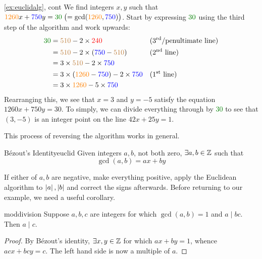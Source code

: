 \begin{example*}{\ref{ex:euclidalg}, cont}{}
	We find integers $x,y$ such that $\textcolor{orange}{1260}x+\textcolor{blue}{750}y=\textcolor{Green}{30} \bigm(=\gcd(\textcolor{orange}{1260},\textcolor{blue}{750})\bigr)$.\smallbreak
	Start by expressing $\textcolor{Green}{30}$ using the third step of the algorithm and work upwards:
	\begin{align*}
		\textcolor{Green}{30} &=\textcolor{brown}{510}-2\times\textcolor{red}{240} & &\text{(3\rd/penultimate line)}\\
		&=\textcolor{brown}{510}-2\times (\textcolor{blue}{750}-\textcolor{brown}{510}) &&\text{(2\nd{} line)}\\
		&=3\times \textcolor{brown}{510}-2\times \textcolor{blue}{750} \\
		&=3\times (\textcolor{orange}{1260}-\textcolor{blue}{750})-2\times \textcolor{blue}{750} &&\text{(1\st{} line)}\\
		&=3\times \textcolor{orange}{1260}-5\times \textcolor{blue}{750}
	\end{align*}
	Rearranging this, we see that $x=3$ and $y=-5$ satisfy the equation $1260x+750y=30$. To simply, we can divide everything through by \textcolor{Green}{30} to see that $(3,-5)$ is an integer point on the line $42x+25y=1$.
\end{example*}


This process of reversing the algorithm works in general.

\begin{cor}{Bézout's Identity}{euclid}
	Given integers $a,b$, not both zero, $\exists a,b\in\mathbb{Z}$ such that
	\[
		\gcd(a,b)=ax+by
	\]
\end{cor}

If either of $a,b$ are negative, make everything positive, apply the Euclidean algorithm to $\left| a\right|,\left| b\right|$ and correct the signs afterwards. Before returning to our example, we need a useful corollary. %

\begin{cor}{}{moddivision}
	Suppose $a,b,c$ are integers for which $\gcd(a,b)=1$ and $a\mid bc$. Then $a\mid c$.
\end{cor}

\begin{proof}
	By Bézout's identity, $\exists x,y\in\mathbb{Z}$ for which $ax+by=1$, whence $acx+bcy=c$. The left hand side is now a multiple of $a$.
\end{proof}

